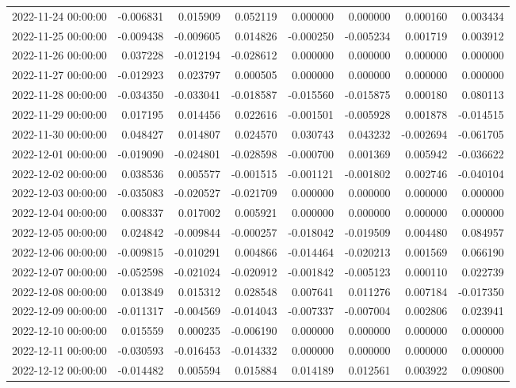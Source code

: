\begin{tabular}{lrrrrrrr}
2022-11-24 00:00:00 & -0.006831 & 0.015909 & 0.052119 & 0.000000 & 0.000000 & 0.000160 & 0.003434 \\
2022-11-25 00:00:00 & -0.009438 & -0.009605 & 0.014826 & -0.000250 & -0.005234 & 0.001719 & 0.003912 \\
2022-11-26 00:00:00 & 0.037228 & -0.012194 & -0.028612 & 0.000000 & 0.000000 & 0.000000 & 0.000000 \\
2022-11-27 00:00:00 & -0.012923 & 0.023797 & 0.000505 & 0.000000 & 0.000000 & 0.000000 & 0.000000 \\
2022-11-28 00:00:00 & -0.034350 & -0.033041 & -0.018587 & -0.015560 & -0.015875 & 0.000180 & 0.080113 \\
2022-11-29 00:00:00 & 0.017195 & 0.014456 & 0.022616 & -0.001501 & -0.005928 & 0.001878 & -0.014515 \\
2022-11-30 00:00:00 & 0.048427 & 0.014807 & 0.024570 & 0.030743 & 0.043232 & -0.002694 & -0.061705 \\
2022-12-01 00:00:00 & -0.019090 & -0.024801 & -0.028598 & -0.000700 & 0.001369 & 0.005942 & -0.036622 \\
2022-12-02 00:00:00 & 0.038536 & 0.005577 & -0.001515 & -0.001121 & -0.001802 & 0.002746 & -0.040104 \\
2022-12-03 00:00:00 & -0.035083 & -0.020527 & -0.021709 & 0.000000 & 0.000000 & 0.000000 & 0.000000 \\
2022-12-04 00:00:00 & 0.008337 & 0.017002 & 0.005921 & 0.000000 & 0.000000 & 0.000000 & 0.000000 \\
2022-12-05 00:00:00 & 0.024842 & -0.009844 & -0.000257 & -0.018042 & -0.019509 & 0.004480 & 0.084957 \\
2022-12-06 00:00:00 & -0.009815 & -0.010291 & 0.004866 & -0.014464 & -0.020213 & 0.001569 & 0.066190 \\
2022-12-07 00:00:00 & -0.052598 & -0.021024 & -0.020912 & -0.001842 & -0.005123 & 0.000110 & 0.022739 \\
2022-12-08 00:00:00 & 0.013849 & 0.015312 & 0.028548 & 0.007641 & 0.011276 & 0.007184 & -0.017350 \\
2022-12-09 00:00:00 & -0.011317 & -0.004569 & -0.014043 & -0.007337 & -0.007004 & 0.002806 & 0.023941 \\
2022-12-10 00:00:00 & 0.015559 & 0.000235 & -0.006190 & 0.000000 & 0.000000 & 0.000000 & 0.000000 \\
2022-12-11 00:00:00 & -0.030593 & -0.016453 & -0.014332 & 0.000000 & 0.000000 & 0.000000 & 0.000000 \\
2022-12-12 00:00:00 & -0.014482 & 0.005594 & 0.015884 & 0.014189 & 0.012561 & 0.003922 & 0.090800 \\

\end{tabular}
